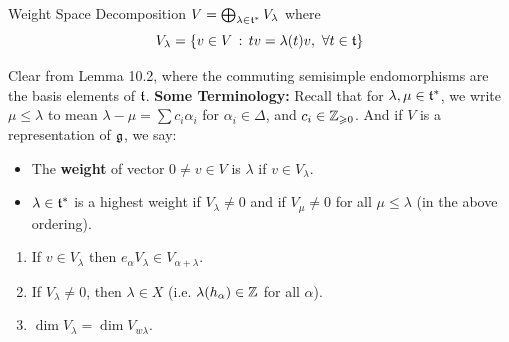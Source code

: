 \documentclass{article}
\begin{document}
\begin{fancylem}{Weight Space Decomposition}
    $V = \bigoplus_{\lambda \in \mathfrak{t}^{*}}V_{\lambda}$ where \[V_{\lambda} = \{v \in V \, : \, tv = \lambda(t)v, \, \, \forall t \in \mathfrak{t}\}\]
\end{fancylem}
\proof Clear from Lemma 10.2, where the commuting semisimple endomorphisms are the basis elements of $\mathfrak{t}$. \endproof
\textbf{Some Terminology:} \gap Recall that for $\lambda, \mu \in \mathfrak{t}^{*}$, we write $\mu \leq \lambda$ to mean $\lambda-\mu = \sum c_{i} \alpha_{i}$ for $\alpha_{i} \in \Delta$, and $c_{i} \in \mathbb{Z}_{\geqslant 0}$. \gap 
And if $V$ is a representation of $\mathfrak{g}$, we say: \begin{itemize}
    \item The \textbf{weight} of vector $0 \neq v \in V$ is $\lambda$ if $v \in V_{\lambda}$.
    \item $\lambda \in \mathfrak{t}^{*}$ is a highest weight if $V_{\lambda} \neq 0$ and if $V_{\mu} \neq 0$ for all $\mu \leq \lambda$ (in the above ordering).
\end{itemize}
\begin{fancyprop}{}\hspace{0.1cm}
    \begin{enumerate}
        \item If $v \in V_{\lambda}$ then $e_{\alpha}V_{\lambda} \in V_{\alpha + \lambda}$.
        \item If $V_{\lambda} \neq 0$, then $\lambda \in X$ (i.e. $\lambda(h_{\alpha}) \in \mathbb{Z}$ for all $\alpha$).
        \item $\dim V_{\lambda} = \dim V_{w\lambda}$.
    \end{enumerate}
\end{fancyprop}
\end{document}
